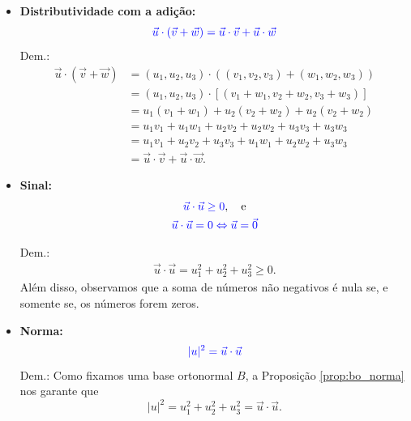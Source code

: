 \begin{itemize}
\item {\bf Distributividade com a adição:}
  \begin{equation}
    {\color{blue}\vec{u}\cdot(\vec{v}+\vec{w}) = \vec{u}\cdot\vec{v}+\vec{u}\cdot\vec{w}}
\end{equation}
  Dem.:
  \begin{align}
    \vec{u}\cdot(\vec{v}+\vec{w}) &= (u_1,u_2,u_3)\cdot\left((v_1,v_2,v_3)+(w_1,w_2,w_3)\right) \\
                                  &= (u_1,u_2,u_3)\cdot [(v_1+w_1,v_2+w_2,v_3+w_3)] \\
                                  &= u_1(v_1+w_1) + u_2(v_2+w_2) + u_2(v_2+w_2) \\
                                  &= u_1v_1+u_1w_1+u_2v_2+u_2w_2+u_3v_3+u_3w_3 \\
                                  &= u_1v_1+u_2v_2+u_3v_3 + u_1w_1+u_2w_2+u_3w_3 \\
                                  &= \vec{u}\cdot\vec{v}+\vec{u}\cdot\vec{w}.
  \end{align}

\item {\bf Sinal:}
  \begin{gather}
    {\color{blue}\vec{u}\cdot\vec{u}\geq 0},\quad\text{e}\\
    {\color{blue}\vec{u}\cdot\vec{u}=0 \Leftrightarrow \vec{u}=\vec{0}}
\end{gather}

  Dem.:
  \begin{align}
    \vec{u}\cdot\vec{u} = u_1^2+u_2^2+u_3^2 \geq 0.
  \end{align}
  Além disso, observamos que a soma de números não negativos é nula se, e somente se, os números forem zeros.

\item {\bf Norma:}
  \begin{equation}
    {\color{blue}|u|^2 = \vec{u}\cdot\vec{u}}
\end{equation}
  Dem.:
  Como fixamos uma base ortonormal $B$, a Proposição \ref{prop:bo_norma} nos garante que
  \begin{equation}
    |u|^2 = u_1^2+u_2^2+u_3^2 = \vec{u}\cdot\vec{u}.
  \end{equation}
\end{itemize}

